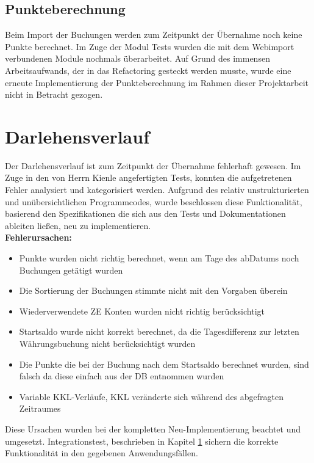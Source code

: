 \documentclass[12pt,             %
               a4paper,          %
               listof=totoc,     %
               index=totoc,      %
               bibliography=totoc,%
               oneside,         %
               BCOR1cm,          %
               english   %
               ]{scrbook}
\begin{document}
\subsection{Punkteberechnung}
Beim Import der Buchungen werden zum Zeitpunkt der Übernahme noch keine Punkte berechnet. Im Zuge der Modul Tests wurden die mit dem Webimport verbundenen Module nochmals überarbeitet. Auf Grund des immensen Arbeitsaufwands, der in das Refactoring gesteckt werden musste, wurde eine erneute Implementierung der Punkteberechnung im Rahmen dieser Projektarbeit nicht in Betracht gezogen. 

\section{Darlehensverlauf}
Der Darlehensverlauf ist zum Zeitpunkt der Übernahme fehlerhaft gewesen. Im Zuge in den von Herrn Kienle angefertigten Tests, konnten die aufgetretenen Fehler analysiert und kategorisiert werden. Aufgrund des relativ unstrukturierten und unübersichtlichen Programmcodes, wurde beschlossen diese Funktionalität, basierend den Spezifikationen die sich aus den Tests und Dokumentationen ableiten ließen, neu zu implementieren.\\

\textbf{Fehlerursachen:}

\begin{itemize}
     \item{Punkte wurden nicht richtig berechnet, wenn am Tage des abDatums noch Buchungen getätigt wurden}
     \item{Die Sortierung der Buchungen stimmte nicht mit den Vorgaben überein}
     \item{Wiederverwendete ZE Konten wurden nicht richtig berücksichtigt}
     \item{Startsaldo wurde nicht korrekt berechnet, da die Tagesdifferenz zur letzten Währungsbuchung nicht berücksichtigt wurden}
     \item{Die Punkte die bei der Buchung nach dem Startsaldo berechnet wurden, sind falsch da diese einfach aus der DB entnommen wurden}
     \item{Variable KKL-Verläufe, KKL veränderte sich während des abgefragten Zeitraumes}
\end{itemize} 

Diese Ursachen wurden bei der kompletten Neu-Implementierung beachtet und umgesetzt. Integrationstest, beschrieben in Kapitel \ref{} sichern die korrekte Funktionalität in den gegebenen Anwendungsfällen.
\end{document}

